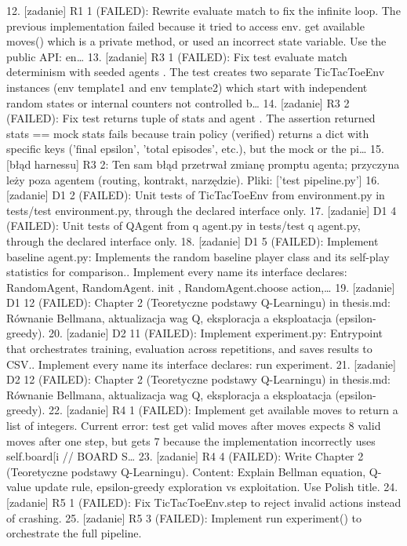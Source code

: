\documentclass[conference]{IEEEtran}
\begin{document}
12. [zadanie] R1 1 (FAILED): Rewrite evaluate match to fix the infinite loop. The previous implementation failed because it tried to access env. get available moves() which is a private method, or used an incorrect state variable. Use the public API: en…
13. [zadanie] R3 1 (FAILED): Fix test evaluate match determinism with seeded agents . The test creates two separate TicTacToeEnv instances (env template1 and env template2) which start with independent random states or internal counters not controlled b…
14. [zadanie] R3 2 (FAILED): Fix test returns tuple of stats and agent . The assertion returned stats == mock stats fails because train policy (verified) returns a dict with specific keys ('final epsilon', 'total episodes', etc.), but the mock or the pi…
15. [błąd harnessu] R3 2: Ten sam błąd przetrwał zmianę promptu agenta; przyczyna leży poza agentem (routing, kontrakt, narzędzie). Pliki: ['test pipeline.py']
16. [zadanie] D1 2 (FAILED): Unit tests of TicTacToeEnv from environment.py in tests/test environment.py, through the declared interface only.
17. [zadanie] D1 4 (FAILED): Unit tests of QAgent from q agent.py in tests/test q agent.py, through the declared interface only.
18. [zadanie] D1 5 (FAILED): Implement baseline agent.py: Implements the random baseline player class and its self-play statistics for comparison.. Implement every name its interface declares: RandomAgent, RandomAgent. init , RandomAgent.choose action,…
19. [zadanie] D1 12 (FAILED): Chapter 2 (Teoretyczne podstawy Q-Learningu) in thesis.md: Równanie Bellmana, aktualizacja wag Q, eksploracja a eksploatacja (epsilon-greedy).
20. [zadanie] D2 11 (FAILED): Implement experiment.py: Entrypoint that orchestrates training, evaluation across repetitions, and saves results to CSV.. Implement every name its interface declares: run experiment.
21. [zadanie] D2 12 (FAILED): Chapter 2 (Teoretyczne podstawy Q-Learningu) in thesis.md: Równanie Bellmana, aktualizacja wag Q, eksploracja a eksploatacja (epsilon-greedy).
22. [zadanie] R4 1 (FAILED): Implement get available moves to return a list of integers. Current error: test get valid moves after moves expects 8 valid moves after one step, but gets 7 because the implementation incorrectly uses self.board[i // BOARD S…
23. [zadanie] R4 4 (FAILED): Write Chapter 2 (Teoretyczne podstawy Q-Learningu). Content: Explain Bellman equation, Q-value update rule, epsilon-greedy exploration vs exploitation. Use Polish title.
24. [zadanie] R5 1 (FAILED): Fix TicTacToeEnv.step to reject invalid actions instead of crashing.
25. [zadanie] R5 3 (FAILED): Implement run experiment() to orchestrate the full pipeline.
\end{document}
